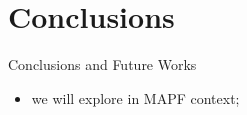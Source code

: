 \section*{Conclusions}

\begin{frame}{Conclusions and Future Works}
    \begin{itemize}
        \item we will explore \CPDSearch{} in MAPF context;
    \end{itemize}
\end{frame}

\begin{frame}[plain,c]

\begin{center}
\end{center}



\begin{center}
\end{center}

\end{frame}